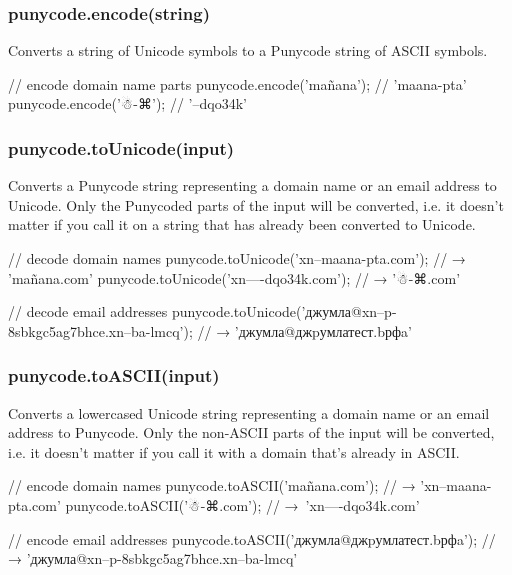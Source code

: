 \subsubsection*{{\ttfamily punycode.\+encode(string)}}

Converts a string of Unicode symbols to a Punycode string of A\+S\+C\+II symbols.


\begin{DoxyCode}
// encode domain name parts
punycode.encode('mañana'); // 'maana-pta'
punycode.encode('☃-⌘'); // '--dqo34k'
\end{DoxyCode}


\subsubsection*{{\ttfamily punycode.\+to\+Unicode(input)}}

Converts a Punycode string representing a domain name or an email address to Unicode. Only the Punycoded parts of the input will be converted, i.\+e. it doesn’t matter if you call it on a string that has already been converted to Unicode.


\begin{DoxyCode}
// decode domain names
punycode.toUnicode('xn--maana-pta.com');
// → 'mañana.com'
punycode.toUnicode('xn----dqo34k.com');
// → '☃-⌘.com'

// decode email addresses
punycode.toUnicode('джумла@xn--p-8sbkgc5ag7bhce.xn--ba-lmcq');
// → 'джумла@джpумлатест.bрфa'
\end{DoxyCode}


\subsubsection*{{\ttfamily punycode.\+to\+A\+S\+C\+I\+I(input)}}

Converts a lowercased Unicode string representing a domain name or an email address to Punycode. Only the non-\/\+A\+S\+C\+II parts of the input will be converted, i.\+e. it doesn’t matter if you call it with a domain that’s already in A\+S\+C\+II.


\begin{DoxyCode}
// encode domain names
punycode.toASCII('mañana.com');
// → 'xn--maana-pta.com'
punycode.toASCII('☃-⌘.com');
// → 'xn----dqo34k.com'

// encode email addresses
punycode.toASCII('джумла@джpумлатест.bрфa');
// → 'джумла@xn--p-8sbkgc5ag7bhce.xn--ba-lmcq'
\end{DoxyCode}


